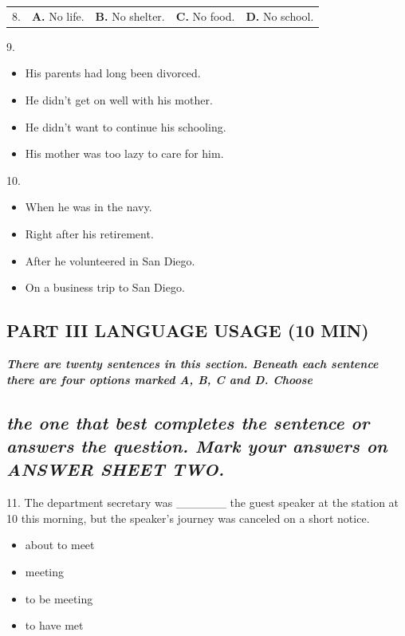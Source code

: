 \documentclass[UTF8,11pt]{ctexart}
\begin{document}
\noindent\begin{tabularx}{\linewidth}{@{}lXXXX@{}}8. & \textbf{A.} No life. & \textbf{B.} No shelter. & \textbf{C.} No food. & \textbf{D.} No school.\\\end{tabularx}\par

9.


\begin{itemize}[leftmargin=2em,itemsep=.2em,topsep=.4em]\item[A.] His parents had long been divorced.
\item[B.] He didn’t get on well with his mother.
\item[C.] He didn’t want to continue his schooling.
\item[D.] His mother was too lazy to care for him.
\end{itemize}

10.


\begin{itemize}[leftmargin=2em,itemsep=.2em,topsep=.4em]\item[A.] When he was in the navy.
\item[B.] Right after his retirement.
\item[C.] After he volunteered in San Diego.
\item[D.] On a business trip to San Diego.
\end{itemize}

\subsection*{\textbf{PART III LANGUAGE USAGE (10 MIN)}}


\textbf{\textit{There are twenty sentences in this section. Beneath each sentence there are four options marked A, B, C and D. Choose}}


\subsection*{\textbf{\textit{the one that best completes the sentence or answers the question. Mark your answers on ANSWER SHEET TWO.}}}


11. The department secretary was \_\_\_\_\_\_ the guest speaker at the station at 10 this morning, but the speaker’s journey was canceled on a short notice.


\begin{itemize}[leftmargin=2em,itemsep=.2em,topsep=.4em]\item[A.] about to meet
\item[B.] meeting
\item[C.] to be meeting
\item[D.] to have met
\end{itemize}
\end{document}
